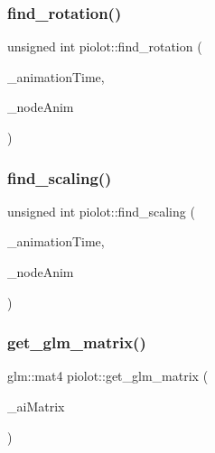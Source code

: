 \mbox{\label{namespacepiolot_a3573afdd46fe4ac83df06c50a0dfe0f3}} 
\subsubsection{\texorpdfstring{find\+\_\+rotation()}{find\_rotation()}}
{\footnotesize\ttfamily unsigned int piolot\+::find\+\_\+rotation (\begin{DoxyParamCaption}\item[{float}]{\+\_\+animation\+Time,  }\item[{const ai\+Node\+Anim $\ast$}]{\+\_\+node\+Anim }\end{DoxyParamCaption})}

\mbox{\label{namespacepiolot_a568b9e7ad3c877dcd9b32fa4e6f6c9e1}} 
\subsubsection{\texorpdfstring{find\+\_\+scaling()}{find\_scaling()}}
{\footnotesize\ttfamily unsigned int piolot\+::find\+\_\+scaling (\begin{DoxyParamCaption}\item[{float}]{\+\_\+animation\+Time,  }\item[{const ai\+Node\+Anim $\ast$}]{\+\_\+node\+Anim }\end{DoxyParamCaption})}

\mbox{\label{namespacepiolot_a935ff41053563f29ec150b73a083a3b8}} 
\subsubsection{\texorpdfstring{get\+\_\+glm\+\_\+matrix()}{get\_glm\_matrix()}}
{\footnotesize\ttfamily glm\+::mat4 piolot\+::get\+\_\+glm\+\_\+matrix (\begin{DoxyParamCaption}\item[{const ai\+Matrix4x4 \&}]{\+\_\+ai\+Matrix }\end{DoxyParamCaption})}


